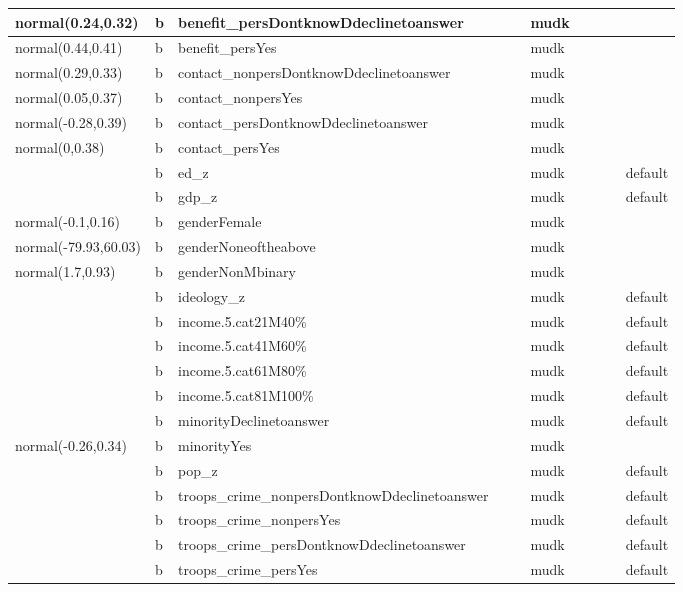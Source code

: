 \documentclass[
]{book}
\theoremstyle{definition}
\theoremstyle{definition}
\theoremstyle{definition}
\theoremstyle{definition}
\theoremstyle{remark}
\begin{document}
\begin{table}
\begin{tabular}[t]{l|l|l|l|l|l|l|l|l|l}
normal(0.24,0.32) & b & benefit\_persDontknowDdeclinetoanswer &  &  & mudk &  &  &  & \\
\hline
normal(0.44,0.41) & b & benefit\_persYes &  &  & mudk &  &  &  & \\
\hline
normal(0.29,0.33) & b & contact\_nonpersDontknowDdeclinetoanswer &  &  & mudk &  &  &  & \\
\hline
normal(0.05,0.37) & b & contact\_nonpersYes &  &  & mudk &  &  &  & \\
\hline
normal(-0.28,0.39) & b & contact\_persDontknowDdeclinetoanswer &  &  & mudk &  &  &  & \\
\hline
normal(0,0.38) & b & contact\_persYes &  &  & mudk &  &  &  & \\
\hline
 & b & ed\_z &  &  & mudk &  &  &  & default\\
\hline
 & b & gdp\_z &  &  & mudk &  &  &  & default\\
\hline
normal(-0.1,0.16) & b & genderFemale &  &  & mudk &  &  &  & \\
\hline
normal(-79.93,60.03) & b & genderNoneoftheabove &  &  & mudk &  &  &  & \\
\hline
normal(1.7,0.93) & b & genderNonMbinary &  &  & mudk &  &  &  & \\
\hline
 & b & ideology\_z &  &  & mudk &  &  &  & default\\
\hline
 & b & income.5.cat21M40\% &  &  & mudk &  &  &  & default\\
\hline
 & b & income.5.cat41M60\% &  &  & mudk &  &  &  & default\\
\hline
 & b & income.5.cat61M80\% &  &  & mudk &  &  &  & default\\
\hline
 & b & income.5.cat81M100\% &  &  & mudk &  &  &  & default\\
\hline
 & b & minorityDeclinetoanswer &  &  & mudk &  &  &  & default\\
\hline
normal(-0.26,0.34) & b & minorityYes &  &  & mudk &  &  &  & \\
\hline
 & b & pop\_z &  &  & mudk &  &  &  & default\\
\hline
 & b & troops\_crime\_nonpersDontknowDdeclinetoanswer &  &  & mudk &  &  &  & default\\
\hline
 & b & troops\_crime\_nonpersYes &  &  & mudk &  &  &  & default\\
\hline
 & b & troops\_crime\_persDontknowDdeclinetoanswer &  &  & mudk &  &  &  & default\\
\hline
 & b & troops\_crime\_persYes &  &  & mudk &  &  &  & default\\

\end{tabular}
\end{table}
\end{document}
